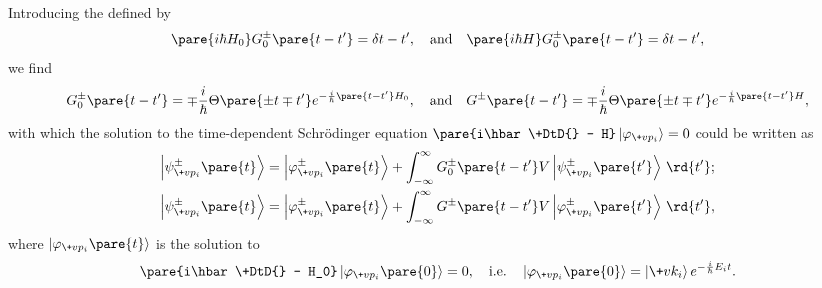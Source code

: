 \documentclass[hidelinks]{article}
\begin{document}
Introducing the  defined by
\[ \pare{i\hbar H_0}G^\pm_0\pare{t - t'} = \delta{t - t'},\quad \text{and}\quad \pare{i\hbar H}G^\pm_0\pare{t - t'} = \delta{t - t'}, \]
we find
\[ G^\pm_0\pare{t-t'} = \mp\frac{i}{\hbar}\Theta\pare{\pm t\mp t'}e^{-\frac{i}{\hbar}\pare{t-t'}H_0},\quad \text{and}\quad G^\pm\pare{t - t'} = \mp\frac{i}{\hbar}\Theta\pare{\pm t\mp t'}e^{-\frac{i}{\hbar}\pare{t - t'}H}, \]
with which the solution to the time-dependent Schr\"odinger equation $\displaystyle \pare{i\hbar\+DtD{} - H}\ket{\varphi_{\+vp_i}} = 0$ could be written as
\begin{align*}
    \ket{\psi^\pm_{\+vp_i}\pare{t}} &= \ket{\varphi^\pm_{\+vp_i}\pare{t}} + \int_{-\infty}^\infty G_0^\pm\pare{t - t'}V\ket{\psi^\pm_{\+vp_i}\pare{t'}}\,\rd{t'}; \\
    \ket{\psi^\pm_{\+vp_i}\pare{t}} &= \ket{\varphi^\pm_{\+vp_i}\pare{t}} + \int_{-\infty}^\infty G^\pm\pare{t - t'}V\ket{\varphi^\pm_{\+vp_i}\pare{t'}}\,\rd{t'},
\end{align*}
where $\ket{\varphi_{\+vp_i}\pare{t}}$ is the solution to
\[ \pare{i\hbar\+DtD{} - H_0}\ket{\varphi_{\+vp_i}\pare{0}} = 0,\quad \text{i.e.}\quad \ket{\varphi_{\+vp_i}\pare{0}} = \ket{\+vk_i}e^{-\frac{i}{\hbar}E_i t}. \]



\end{document}
